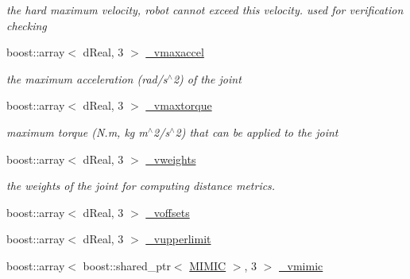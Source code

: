 \begin{DoxyCompactItemize}
\begin{DoxyCompactList}\small\item\em the hard maximum velocity, robot cannot exceed this velocity. used for verification checking \item\end{DoxyCompactList}\item 
\hypertarget{classOpenRAVE_1_1KinBody_1_1Joint_a0cf3254c3e7a7e58427bf27d31757126}{
boost::array$<$ dReal, 3 $>$ \hyperlink{classOpenRAVE_1_1KinBody_1_1Joint_a0cf3254c3e7a7e58427bf27d31757126}{\_\-vmaxaccel}}
\label{classOpenRAVE_1_1KinBody_1_1Joint_a0cf3254c3e7a7e58427bf27d31757126}

\begin{DoxyCompactList}\small\item\em the maximum acceleration (rad/s$^\wedge$2) of the joint \item\end{DoxyCompactList}\item 
\hypertarget{classOpenRAVE_1_1KinBody_1_1Joint_a9653640e1b079a0ea7d9b2dc54743b6f}{
boost::array$<$ dReal, 3 $>$ \hyperlink{classOpenRAVE_1_1KinBody_1_1Joint_a9653640e1b079a0ea7d9b2dc54743b6f}{\_\-vmaxtorque}}
\label{classOpenRAVE_1_1KinBody_1_1Joint_a9653640e1b079a0ea7d9b2dc54743b6f}

\begin{DoxyCompactList}\small\item\em maximum torque (N.m, kg m$^\wedge$2/s$^\wedge$2) that can be applied to the joint \item\end{DoxyCompactList}\item 
\hypertarget{classOpenRAVE_1_1KinBody_1_1Joint_a54b3b5826708888da547faeb1869895a}{
boost::array$<$ dReal, 3 $>$ \hyperlink{classOpenRAVE_1_1KinBody_1_1Joint_a54b3b5826708888da547faeb1869895a}{\_\-vweights}}
\label{classOpenRAVE_1_1KinBody_1_1Joint_a54b3b5826708888da547faeb1869895a}

\begin{DoxyCompactList}\small\item\em the weights of the joint for computing distance metrics. \item\end{DoxyCompactList}\item 
boost::array$<$ dReal, 3 $>$ \hyperlink{classOpenRAVE_1_1KinBody_1_1Joint_a463725ce817eef88b032307e46c97ed6}{\_\-voffsets}
\item 
boost::array$<$ dReal, 3 $>$ \hyperlink{classOpenRAVE_1_1KinBody_1_1Joint_ae9fd2b8d21b33d02a24eb85440d7f4df}{\_\-vupperlimit}
\item 
\hypertarget{classOpenRAVE_1_1KinBody_1_1Joint_af78763e010f75c80880d13539d899694}{
boost::array$<$ boost::shared\_\-ptr$<$ \hyperlink{structOpenRAVE_1_1KinBody_1_1Joint_1_1MIMIC}{MIMIC} $>$, 3 $>$ \hyperlink{classOpenRAVE_1_1KinBody_1_1Joint_af78763e010f75c80880d13539d899694}{\_\-vmimic}}
\label{classOpenRAVE_1_1KinBody_1_1Joint_af78763e010f75c80880d13539d899694}


\end{DoxyCompactItemize}
